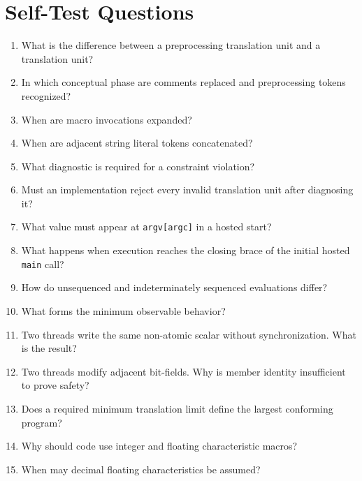 \documentclass[10pt,letterpaper]{article}
\begin{document}
\section{Self-Test Questions}
\begin{enumerate}
  \item What is the difference between a preprocessing translation unit and a translation unit?
  \item In which conceptual phase are comments replaced and preprocessing tokens recognized?
  \item When are macro invocations expanded?
  \item When are adjacent string literal tokens concatenated?
  \item What diagnostic is required for a constraint violation?
  \item Must an implementation reject every invalid translation unit after diagnosing it?
  \item What value must appear at \texttt{argv[argc]} in a hosted start?
  \item What happens when execution reaches the closing brace of the initial hosted \texttt{main} call?
  \item How do unsequenced and indeterminately sequenced evaluations differ?
  \item What forms the minimum observable behavior?
  \item Two threads write the same non-atomic scalar without synchronization. What is the result?
  \item Two threads modify adjacent bit-fields. Why is member identity insufficient to prove safety?
  \item Does a required minimum translation limit define the largest conforming program?
  \item Why should code use integer and floating characteristic macros?
  \item When may decimal floating characteristics be assumed?
\end{enumerate}

\clearpage
\end{document}
